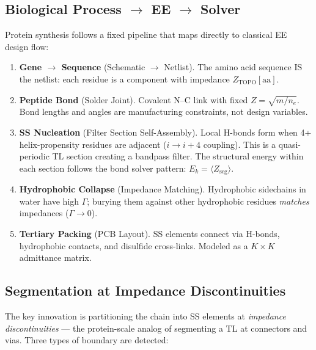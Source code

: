 \subsection{Biological Process $\to$ EE $\to$ Solver}
\label{sec:biology_ee_solver}

Protein synthesis follows a fixed pipeline that maps directly to classical EE design flow:

\begin{enumerate}
\item \textbf{Gene $\to$ Sequence} (Schematic $\to$ Netlist).  The amino acid sequence IS the netlist: each residue is a component with impedance $Z_\text{TOPO}[\text{aa}]$.

\item \textbf{Peptide Bond} (Solder Joint).  Covalent N--C link with fixed $Z = \sqrt{m/n_e}$.  Bond lengths and angles are manufacturing constraints, not design variables.

\item \textbf{SS Nucleation} (Filter Section Self-Assembly).  Local H-bonds form when 4+ helix-propensity residues are adjacent ($i \to i{+}4$ coupling).  This is a quasi-periodic TL section creating a bandpass filter.  The structural energy within each section follows the bond solver pattern: $E_k = \langle Z_\text{seg} \rangle$.

\item \textbf{Hydrophobic Collapse} (Impedance Matching).  Hydrophobic sidechains in water have high $\Gamma$; burying them against other hydrophobic residues \emph{matches} impedances ($\Gamma \to 0$).

\item \textbf{Tertiary Packing} (PCB Layout).  SS elements connect via H-bonds, hydrophobic contacts, and disulfide cross-links.  Modeled as a $K \times K$ admittance matrix.
\end{enumerate}


\subsection{Segmentation at Impedance Discontinuities}
\label{sec:multiscale_segmentation}
\label{sec:segmentation}

The key innovation is partitioning the chain into SS elements at \emph{impedance discontinuities} --- the protein-scale analog of segmenting a TL at connectors and vias.  Three types of boundary are detected:

